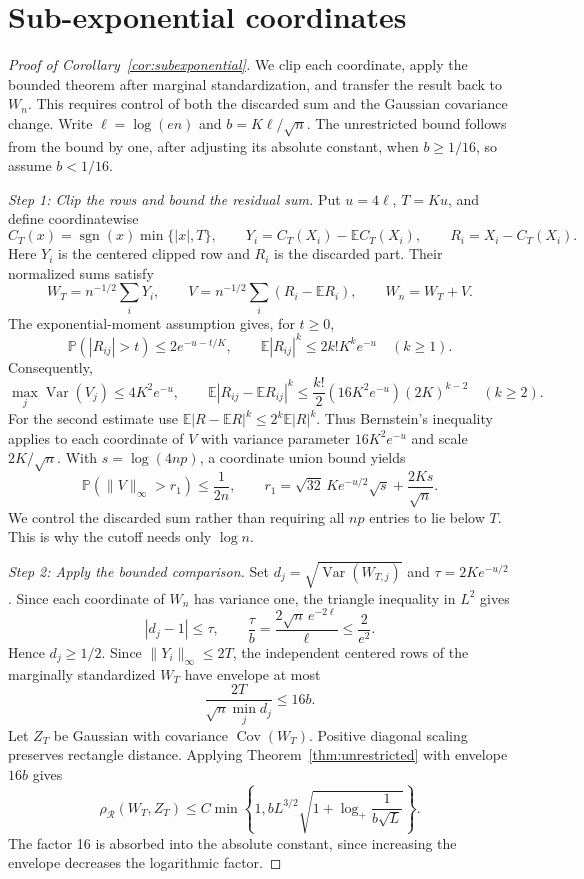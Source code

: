 \documentclass[11pt,letterpaper]{article}
\theoremstyle{remark}
\newcommand{\E}{\mathbb E}
\newcommand{\Pp}{\mathbb P}
\newcommand{\Cov}{\operatorname{Cov}}
\newcommand{\Var}{\operatorname{Var}}
\newcommand{\rh}{\rho_{\mathcal R}}
\begin{document}
\section{Sub-exponential coordinates}\label{app:subexponential}
\begin{proof}[Proof of Corollary~\ref{cor:subexponential}]
We clip each coordinate, apply the bounded theorem after marginal
standardization, and transfer the result back to \(W_n\). This requires
control of both the discarded sum and the Gaussian covariance change.
Write \(\ell=\log(en)\) and \(b=K\ell/\sqrt n\). The unrestricted
bound follows from the bound by one, after adjusting its absolute
constant, when \(b\ge1/16\), so assume \(b<1/16\).

\emph{Step 1: Clip the rows and bound the residual sum.}
Put \(u=4\ell\), \(T=Ku\), and define coordinatewise
\[
 C_T(x)=\operatorname{sgn}(x)\min\{|x|,T\},\qquad
 Y_i=C_T(X_i)-\E C_T(X_i),\qquad R_i=X_i-C_T(X_i).
\]
Here \(Y_i\) is the centered clipped row and \(R_i\) is the discarded
part. Their normalized sums satisfy
\[
 W_T=n^{-1/2}\sum_iY_i,\qquad
 V=n^{-1/2}\sum_i(R_i-\E R_i),\qquad W_n=W_T+V.
\]
The exponential-moment assumption gives, for \(t\ge0\),
\[
 \Pp(|R_{ij}|>t)\le2e^{-u-t/K},\qquad
 \E|R_{ij}|^k\le2k!K^ke^{-u}\quad(k\ge1).
\]
Consequently,
\begin{equation}
 \max_j\Var(V_j)\le4K^2e^{-u},\qquad
 \E|R_{ij}-\E R_{ij}|^k
 \le\frac{k!}{2}(16K^2e^{-u})(2K)^{k-2}
 \quad(k\ge2).
 \label{tail:residual-moments}
\end{equation}
For the second estimate use
\(\E|R-\E R|^k\le2^k\E|R|^k\).
Thus Bernstein's inequality applies to each coordinate of \(V\) with
variance parameter \(16K^2e^{-u}\) and scale \(2K/\sqrt n\).
With \(s=\log(4np)\), a coordinate union bound yields
\begin{equation}
 \Pp(\|V\|_\infty>r_1)\le\frac1{2n},\qquad
 r_1=\sqrt{32}\,Ke^{-u/2}\sqrt s+\frac{2Ks}{\sqrt n}.
 \label{tail:sum-coupling}
\end{equation}
We control the discarded sum rather than requiring all \(np\) entries
to lie below \(T\). This is why the cutoff needs only \(\log n\).

\emph{Step 2: Apply the bounded comparison.}
Set \(d_j=\sqrt{\Var(W_{T,j})}\) and \(\tau=2Ke^{-u/2}\).
Since each coordinate of \(W_n\) has variance one, the triangle
inequality in \(L^2\) gives
\[
 |d_j-1|\le\tau,
 \qquad \frac\tau b=\frac{2\sqrt n\,e^{-2\ell}}\ell
 \le\frac2{e^2}.
\]
Hence \(d_j\ge1/2\). Since \(\|Y_i\|_\infty\le2T\), the
independent centered rows of the marginally standardized \(W_T\)
have envelope at most
\[
 \frac{2T}{\sqrt n\min_jd_j}\le16b.
\]
Let \(Z_T\) be Gaussian with covariance \(\Cov(W_T)\).
Positive diagonal scaling preserves rectangle distance. Applying
Theorem~\ref{thm:unrestricted} with envelope \(16b\) gives
\begin{equation}
 \rh(W_T,Z_T)\le C\min\left\{1,
 bL^{3/2}\sqrt{1+\log_+\frac1{b\sqrt L}}\right\}.
 \label{tail:bounded-comparison}
\end{equation}
The factor 16 is absorbed into the absolute constant, since increasing
the envelope decreases the logarithmic factor.


\end{proof}
\end{document}
